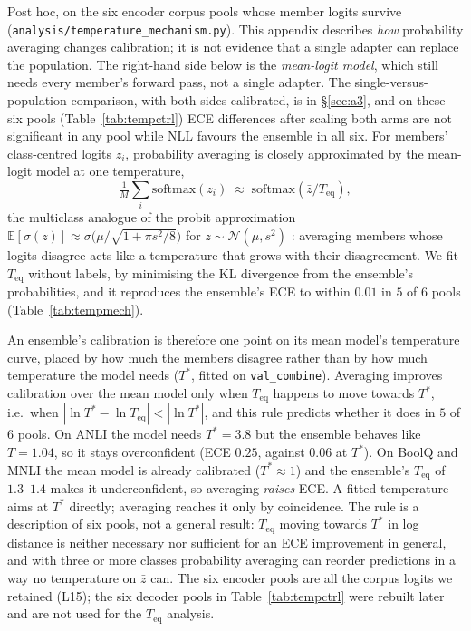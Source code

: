 \documentclass[11pt]{article}
\begin{document}
Post hoc, on the six encoder corpus pools whose member logits survive (\texttt{analysis/\allowbreak temperature\_\allowbreak mechanism.\allowbreak py}). This appendix describes \emph{how} probability averaging changes calibration; it is not evidence that a single adapter can replace the population. The right-hand side below is the \emph{mean-logit model}, which still needs every member's forward pass, not a single adapter. The single-versus-population comparison, with both sides calibrated, is in \S\ref{sec:a3}, and on these six pools (Table~\ref{tab:tempctrl}) ECE differences after scaling both arms are not significant in any pool while NLL favours the ensemble in all six. For members' class-centred logits $z_i$, probability averaging is closely approximated by the mean-logit model at one temperature,
\begin{equation}
\tfrac{1}{M}\textstyle\sum_{i} \mathrm{softmax}(z_i) \;\approx\; \mathrm{softmax}(\bar z / T_{\mathrm{eq}}),
\end{equation}
the multiclass analogue of the probit approximation $\mathbb{E}[\sigma(z)]\approx\sigma\big(\mu/\sqrt{1+\pi s^2/8}\big)$ for $z\sim\mathcal{N}(\mu,s^2)$ \citep{mackay1992evidence}: averaging members whose logits disagree acts like a temperature that grows with their disagreement. We fit $T_{\mathrm{eq}}$ without labels, by minimising the KL divergence from the ensemble's probabilities, and it reproduces the ensemble's ECE to within $0.01$ in $5$ of $6$ pools (Table~\ref{tab:tempmech}).

An ensemble's calibration is therefore one point on its mean model's temperature curve, placed by how much the members disagree rather than by how much temperature the model needs ($T^*$, fitted on \texttt{val\_combine}). Averaging improves calibration over the mean model only when $T_{\mathrm{eq}}$ happens to move towards $T^*$, i.e.\ when $|\ln T^*-\ln T_{\mathrm{eq}}|<|\ln T^*|$, and this rule predicts whether it does in $5$ of $6$ pools. On ANLI the model needs $T^*{=}3.8$ but the ensemble behaves like $T{=}1.04$, so it stays overconfident (ECE $0.25$, against $0.06$ at $T^*$). On BoolQ and MNLI the mean model is already calibrated ($T^*\!\approx\!1$) and the ensemble's $T_{\mathrm{eq}}$ of $1.3$--$1.4$ makes it underconfident, so averaging \emph{raises} ECE. A fitted temperature aims at $T^*$ directly; averaging reaches it only by coincidence. The rule is a description of six pools, not a general result: $T_{\mathrm{eq}}$ moving towards $T^*$ in log distance is neither necessary nor sufficient for an ECE improvement in general, and with three or more classes probability averaging can reorder predictions in a way no temperature on $\bar z$ can. The six encoder pools are all the corpus logits we retained (L15); the six decoder pools in Table~\ref{tab:tempctrl} were rebuilt later and are not used for the $T_{\mathrm{eq}}$ analysis.
\end{document}
